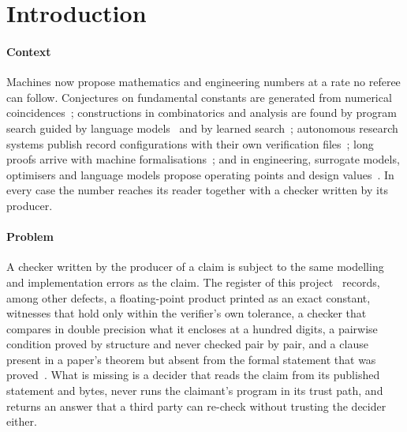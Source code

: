 \documentclass[preprint,11pt,a4paper]{elsarticle}
\theoremstyle{definition}
\begin{document}
\section{Introduction}\label{sec:intro}

\paragraph{Context}
Machines now propose mathematics and engineering numbers at a rate no referee can follow. Conjectures on fundamental constants are generated from numerical coincidences~\citep{Raayoni21}; constructions in combinatorics and analysis are found by program search guided by language models~\citep{RomeraParedes24,Novikov25,GGSWT25} and by learned search~\citep{Wagner21,Davies21,Fawzi22}; autonomous research systems publish record configurations with their own verification files~\citep{Yang26}; long proofs arrive with machine formalisations~\citep{OpenAINS,OpenAIMath,Trinh24}; and in engineering, surrogate models, optimisers and language models propose operating points and design values~\citep{P2}. In every case the number reaches its reader together with a checker written by its producer.

\paragraph{Problem}
A checker written by the producer of a claim is subject to the same modelling and implementation errors as the claim. The register of this project~\citep{Register} records, among other defects, a floating-point product printed as an exact constant, witnesses that hold only within the verifier's own tolerance, a checker that compares in double precision what it encloses at a hundred digits, a pairwise condition proved by structure and never checked pair by pair, and a clause present in a paper's theorem but absent from the formal statement that was proved~\citep{Bastounis26}. What is missing is a decider that reads the claim from its published statement and bytes, never runs the claimant's program in its trust path, and returns an answer that a third party can re-check without trusting the decider either.
\end{document}
